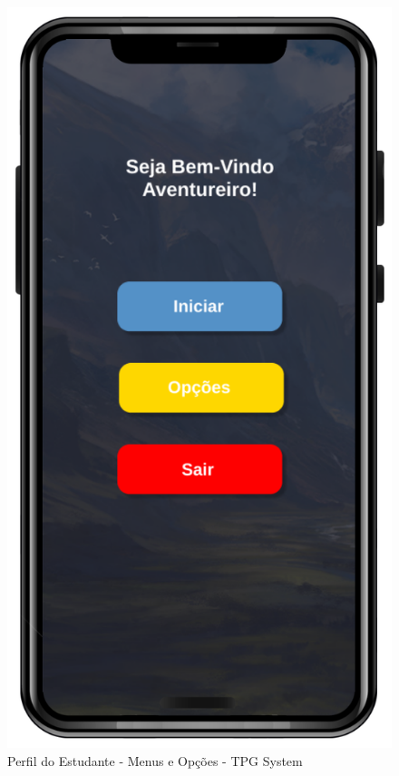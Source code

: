 \begin{figure}[!h]
\centering
\caption{Perfil do Estudante - Menus e Opções - TPG System}%
\label{fig:Tela10}
\includegraphics[scale=0.20]{Illustrations/Tela10.png}
\end{figure}


